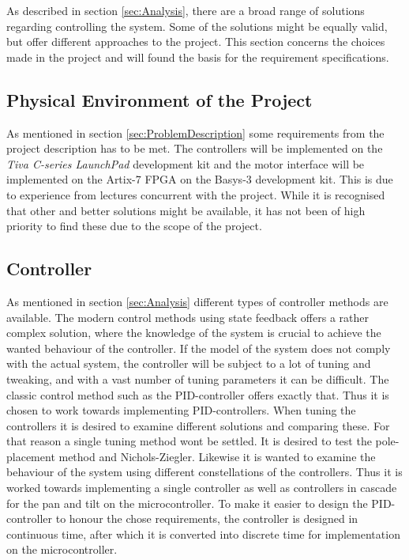 \documentclass[../../main.tex]{subfiles}
\begin{document}
As described in section \ref{sec:Analysis}, there are a broad range of solutions regarding controlling the system. Some of the solutions might be equally valid, but offer different approaches to the project. This section concerns the choices made in the project and will found the basis for the requirement specifications.

\subsection*{Physical Environment of the Project}
As mentioned in section \ref{sec:ProblemDescription} some requirements from the project description has to be met. The controllers will be implemented on the \textit{Tiva C-series LaunchPad} development kit and the motor interface will be implemented on the Artix-7 FPGA on the Basys-3 development kit. This is due to experience from lectures concurrent with the project. While it is recognised that other and better solutions might be available, it has not been of high priority to find these due to the scope of the project. 



\subsection*{Controller}
As mentioned in section \ref{sec:Analysis} different types of controller methods are available. The modern control methods using state feedback offers a rather complex solution, where the knowledge of the system is crucial to achieve the wanted behaviour of the controller. If the model of the system does not comply with the actual system, the controller will be subject to a lot of tuning and tweaking, and with a vast number of tuning parameters it can be difficult. The classic control method such as the PID-controller offers exactly that. Thus it is chosen to work towards implementing PID-controllers. When tuning the controllers it is desired to examine different solutions and comparing these. For that reason a single tuning method wont be settled. It is desired to test the pole-placement method and Nichols-Ziegler. Likewise it is wanted to examine the behaviour of the system using different constellations of the controllers. Thus it is worked towards implementing a single controller as well as controllers in cascade for the pan and tilt on the microcontroller. To make it easier to design the PID-controller to honour the chose requirements, the controller is designed in continuous time, after which it is converted into discrete time for implementation on the microcontroller. 
\end{document}
